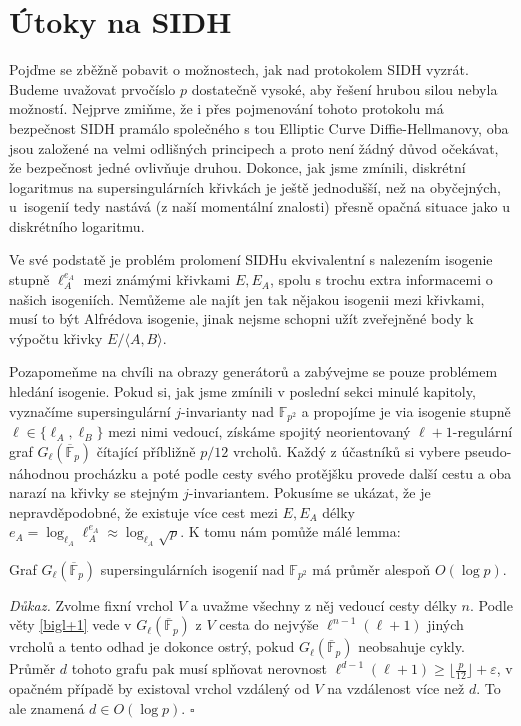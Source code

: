 \documentclass[12pt]{report}
\begin{document}
\section{Útoky na SIDH}

Pojďme se zběžně pobavit o možnostech, jak nad protokolem SIDH vyzrát. Budeme uvažovat prvočíslo $p$ dostatečně vysoké, aby řešení hrubou silou nebyla možností. Nejprve zmiňme, že i přes pojmenování tohoto protokolu má bezpečnost SIDH pramálo společného s tou Elliptic Curve Diffie-Hellmanovy, oba jsou založené na velmi odlišných principech a proto není žádný důvod očekávat, že bezpečnost jedné ovlivňuje druhou. Dokonce, jak jsme zmínili, diskrétní logaritmus na supersingulárních křivkách je ještě jednodušší, než na obyčejných, u~isogenií tedy nastává (z naší momentální znalosti) přesně opačná situace jako u diskrétního logaritmu.

Ve své podstatě je problém prolomení SIDHu ekvivalentní s nalezením isogenie stupně $\ell_A ^{e_A}$ mezi známými křivkami $E,E_A$, spolu s trochu extra informacemi o našich isogeniích. Nemůžeme ale najít jen tak nějakou isogenii mezi křivkami, musí to být Alfrédova isogenie, jinak nejsme schopni užít zveřejněné body k výpočtu křivky $E/\langle A,B \rangle$.

Pozapomeňme na chvíli na obrazy generátorů a zabývejme se pouze problémem hledání isogenie. Pokud si, jak jsme zmínili v poslední sekci minulé kapitoly, vyznačíme supersingulární $j$-invarianty nad $\mathbb{F}_{p^2}$ a propojíme je via isogenie stupně $\ell \in \lbrace \ell_A, \ell_B \rbrace$  mezi nimi vedoucí, získáme spojitý neorientovaný $\ell+1$-regulární graf $G_{\ell} (\overline{\mathbb{F}}_p)$ čítající příbližně $p/12$ vrcholů. Každý z účastníků si vybere pseudo-náhodnou procházku a poté podle cesty svého protějšku provede další cestu a oba narazí na křivky se stejným $j$-invariantem. Pokusíme se ukázat, že je nepravděpodobné, že existuje více cest mezi $E,E_A$ délky $e_A = \log_{\ell_A} \ell_A ^{e_A} \approx \log_{\ell_A} \sqrt{p}$. K tomu nám pomůže málé lemma:

\begin{lemma*}
Graf $G_{\ell} (\overline{\mathbb{F}}_p)$ supersingulárních isogenií nad $\mathbb{F}_{p^2}$ má průměr alespoň $O(\log p)$.
\end{lemma*}
\noindent \textit{Důkaz.} Zvolme fixní vrchol $V$ a uvažme všechny z něj vedoucí cesty délky $n$. Podle věty \ref{bigl+1} vede v $G_{\ell} (\overline{\mathbb{F}}_p)$ z $V$ cesta do nejvýše $\ell^{n-1} (\ell+1)$ jiných vrcholů a tento odhad je dokonce ostrý, pokud $G_{\ell} (\overline{\mathbb{F}}_p)$ neobsahuje cykly. Průměr $d$ tohoto grafu pak musí splňovat nerovnost $\ell^{d-1} (\ell+1) \geqslant \lfloor \frac{p}{12} \rfloor + \varepsilon$, v opačném případě by existoval vrchol vzdálený od $V$ na vzdálenost více než $d$. To ale znamená $d \in O(\log p)$. \hfill $\square$\\
\end{document}
